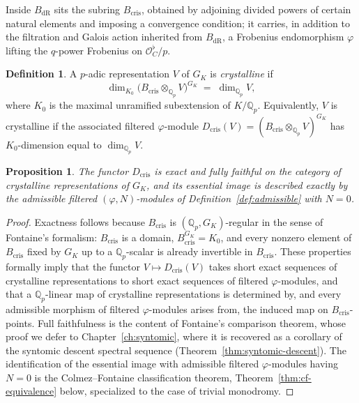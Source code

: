 \documentclass[10pt]{amsbook}
\newtheorem{proposition}[theorem]{Proposition}
\theoremstyle{definition}
\newtheorem{definition}[theorem]{Definition}
\theoremstyle{remark}
\newcommand{\Qp}{\mathbb{Q}_p}
\begin{document}
Inside $B_{\mathrm{dR}}$ sits the subring $B_{\mathrm{cris}}$, obtained by adjoining divided
powers of certain natural elements and imposing a convergence condition; it carries, in
addition to the filtration and Galois action inherited from $B_{\mathrm{dR}}$, a Frobenius
endomorphism $\varphi$ lifting the $q$-power Frobenius on $\mathcal{O}_C^\flat/p$.

\begin{definition}\label{def:crystalline-rep}
A $p$-adic representation $V$ of $G_K$ is \emph{crystalline} if
\[
  \dim_{K_0} \bigl(B_{\mathrm{cris}} \otimes_{\Qp} V\bigr)^{G_K} \;=\; \dim_{\Qp} V,
\]
where $K_0$ is the maximal unramified subextension of $K/\Qp$. Equivalently, $V$ is
crystalline if the associated filtered $\varphi$-module
$D_{\mathrm{cris}}(V) = (B_{\mathrm{cris}} \otimes_{\Qp} V)^{G_K}$ has $K_0$-dimension equal
to $\dim_{\Qp} V$.
\end{definition}

\begin{proposition}\label{prop:dcris-functor}
The functor $D_{\mathrm{cris}}$ is exact and fully faithful on the category of crystalline
representations of $G_K$, and its essential image is described exactly by the admissible
filtered $(\varphi, N)$-modules of Definition~\ref{def:admissible} with $N = 0$.
\end{proposition}

\begin{proof}
Exactness follows because $B_{\mathrm{cris}}$ is $(\Qp, G_K)$-regular in the sense of
Fontaine's formalism: $B_{\mathrm{cris}}$ is a domain, $B_{\mathrm{cris}}^{G_K} = K_0$, and
every nonzero element of $B_{\mathrm{cris}}$ fixed by $G_K$ up to a $\Qp$-scalar is already
invertible in $B_{\mathrm{cris}}$. These properties formally imply that the functor
$V \mapsto D_{\mathrm{cris}}(V)$ takes short exact sequences of crystalline representations
to short exact sequences of filtered $\varphi$-modules, and that a $\Qp$-linear map of
crystalline representations is determined by, and every admissible morphism of filtered
$\varphi$-modules arises from, the induced map on $B_{\mathrm{cris}}$-points. Full faithfulness
is the content of Fontaine's comparison theorem, whose proof we defer to
Chapter~\ref{ch:syntomic}, where it is recovered as a corollary of the syntomic descent
spectral sequence (Theorem~\ref{thm:syntomic-descent}). The identification of the essential
image with admissible filtered $\varphi$-modules having $N=0$ is the
Colmez--Fontaine classification theorem, Theorem~\ref{thm:cf-equivalence} below,
specialized to the case of trivial monodromy.
\end{proof}
\end{document}
